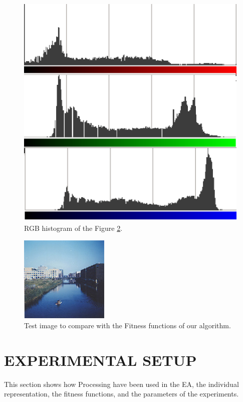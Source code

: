 \documentclass[a4paper,twoside]{article}
\begin{document}
\begin{figure}
\centering
   \includegraphics[scale =0.6] {images/histogram.eps}
\caption{RGB histogram of the Figure \ref{fig:flevopark}. }
\label{fig:histogram}
\end{figure}

\begin{figure}
\centering
   \includegraphics[scale =3] {images/flevopark.eps}
\caption{Test image to compare with the Fitness functions of our algorithm.}
\label{fig:flevopark}
\end{figure}

\section{EXPERIMENTAL SETUP}
\label{sec:setup}

\noindent This section shows how Processing have been used in the EA, the individual representation, the fitness functions, and the parameters of the experiments.
\end{document}
